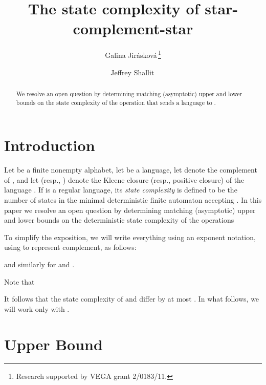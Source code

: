 \documentclass[runningheads]{llncs}
\begin{document}
\title{The state complexity of star-complement-star}
\author{
Galina Jir\'{a}skov\'{a}\,\thanks{Research supported by  VEGA grant  2/0183/11.}
  \and 
   Jeffrey Shallit\,}

\maketitle

\begin{abstract}
\label{***abstract}
We resolve an open question by determining matching (asymptotic) 
upper and lower bounds on the state complexity of the
operation that sends a language  to 
.
\end{abstract}
  
\section{Introduction}
\label{***intro}

Let  be a finite nonempty alphabet, let  be
a language, let  denote the complement of
, and let  (resp., ) denote the Kleene closure
(resp., positive closure) of the language .
If  is a regular language, its {\it state complexity\/}
is defined to be the number of states in the minimal deterministic
finite automaton accepting  \cite{yzs94}.
In this paper we resolve an open question by determining matching
(asymptotic) upper and
lower bounds on the deterministic state complexity of the operations


To simplify the exposition, we will write everything using an exponent notation,
using  to represent complement,
as follows:

and similarly for  and .

Note that


It follows that the state complexity of  and
 differ by at most .  In what follows, we will work
only with .

\section{Upper Bound}
\label{***upper}
\end{document}
